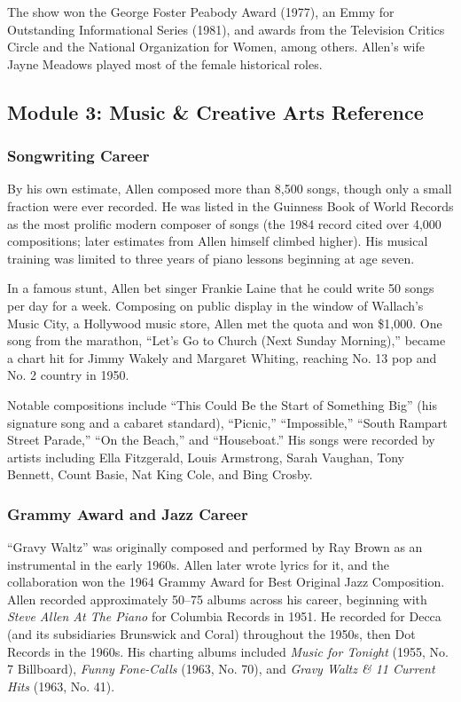 \documentclass[11pt,letterpaper]{article}
\begin{document}
The show won the George Foster Peabody Award (1977), an Emmy for Outstanding Informational Series (1981), and awards from the Television Critics Circle and the National Organization for Women, among others. Allen's wife Jayne Meadows played most of the female historical roles.

\subsection{Module 3: Music \& Creative Arts Reference}

\subsubsection{Songwriting Career}

By his own estimate, Allen composed more than 8,500 songs, though only a small fraction were ever recorded. He was listed in the Guinness Book of World Records as the most prolific modern composer of songs (the 1984 record cited over 4,000 compositions; later estimates from Allen himself climbed higher). His musical training was limited to three years of piano lessons beginning at age seven.

In a famous stunt, Allen bet singer Frankie Laine that he could write 50 songs per day for a week. Composing on public display in the window of Wallach's Music City, a Hollywood music store, Allen met the quota and won \$1,000. One song from the marathon, ``Let's Go to Church (Next Sunday Morning),'' became a chart hit for Jimmy Wakely and Margaret Whiting, reaching No. 13 pop and No. 2 country in 1950.

Notable compositions include ``This Could Be the Start of Something Big'' (his signature song and a cabaret standard), ``Picnic,'' ``Impossible,'' ``South Rampart Street Parade,'' ``On the Beach,'' and ``Houseboat.'' His songs were recorded by artists including Ella Fitzgerald, Louis Armstrong, Sarah Vaughan, Tony Bennett, Count Basie, Nat King Cole, and Bing Crosby.

\subsubsection{Grammy Award and Jazz Career}

``Gravy Waltz'' was originally composed and performed by Ray Brown as an instrumental in the early 1960s. Allen later wrote lyrics for it, and the collaboration won the 1964 Grammy Award for Best Original Jazz Composition. Allen recorded approximately 50--75 albums across his career, beginning with \textit{Steve Allen At The Piano} for Columbia Records in 1951. He recorded for Decca (and its subsidiaries Brunswick and Coral) throughout the 1950s, then Dot Records in the 1960s. His charting albums included \textit{Music for Tonight} (1955, No. 7 Billboard), \textit{Funny Fone-Calls} (1963, No. 70), and \textit{Gravy Waltz \& 11 Current Hits} (1963, No. 41).
\end{document}
